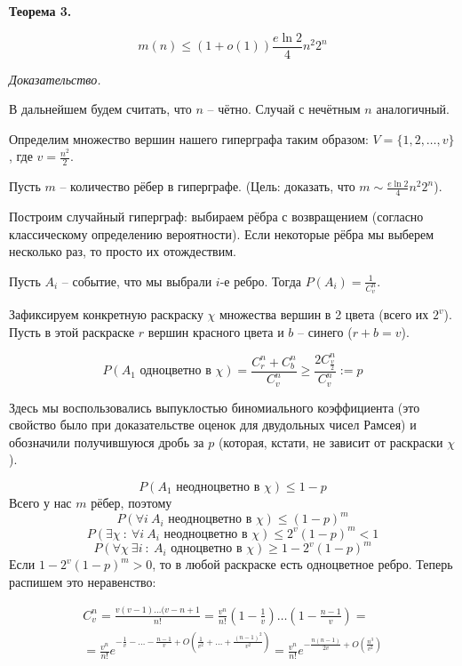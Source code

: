 \textbf{Теорема 3.}

$$
m(n) \leqslant (1 + o(1)) \frac{e \ln 2}{4} n^2 2^n
$$

\textit{Доказательство.}

В дальнейшем будем считать, что $n$ -- чётно. Случай с нечётным $n$ аналогичный.

Определим множество вершин нашего гиперграфа таким образом:
$V = \{1, 2, \dots, v\}$, где $v = \frac{n^2}{2}$.

Пусть $m$ -- количество рёбер в гиперграфе. (Цель: доказать, что $m \sim \frac{e \ln 2}{4} n^2 2^n$).

Построим случайный гиперграф: выбираем рёбра с возвращением (согласно классическому определению вероятности). Если некоторые рёбра мы выберем несколько раз, то просто их отождествим.

Пусть $A_i$ -- событие, что мы выбрали $i$-е ребро. Тогда $P(A_i) = \frac{1}{C_v^n}$.

Зафиксируем конкретную раскраску $\chi$ множества вершин в 2 цвета (всего их $2^v$). Пусть в этой раскраске $r$ вершин красного цвета и $b$ -- синего ($r + b = v$).

$$
P(A_1 \text{ одноцветно в } \chi) = \frac{C_r^n + C_b^n}{C_v^n} \geqslant 
\frac{2 C_{\frac{v}{2}}^n}{C_v^n} := p
$$

Здесь мы воспользовались выпуклостью биномиального коэффициента (это свойство было при доказательстве оценок для двудольных чисел Рамсея) и обозначили получившуюся дробь за $p$ (которая, кстати, не зависит от раскраски $\chi$).

$$
P(A_1 \text{ неодноцветно в } \chi) \leqslant 1 - p
$$
Всего у нас $m$ рёбер, поэтому
$$
P(\forall i \ A_i \text{ неодноцветно в } \chi) \leqslant (1 - p)^m
$$
$$
P(\exists \chi \ :\  \forall i \ A_i \text{ неодноцветно в } \chi) \leqslant
2^v (1 - p)^m < 1
$$
$$
P(\forall \chi \  \exists i \ :\ A_i \text{ одноцветно в } \chi) \geqslant
1 - 2^v (1 - p)^m
$$
Если $1 - 2^v (1 - p)^m > 0$, то в любой раскраске есть одноцветное ребро. Теперь распишем это неравенство:

\begin{multline*}
C_v^n = \frac{v (v - 1) \ldots (v - n + 1}{n!} = 
\frac{v^n}{n!} \left( 1 - \frac{1}{v} \right) \ldots \left( 1 - \frac{n - 1}{v} \right) = \\
= \frac{v^n}{n!} e^{-\frac{1}{v} - \ldots - \frac{n - 1}{v} + 
O \left( \frac{1}{v^2} + \ldots + \frac{(n - 1)^2}{v^2} \right)}
= \frac{v^n}{n!} e^{-\frac{n(n - 1)}{2v} + O \left( \frac{n^3}{v^2} \right)}
\end{multline*}


